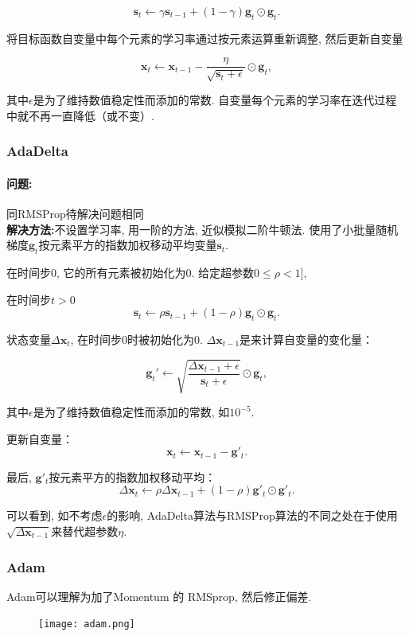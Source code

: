 $$\mathbf{s}_t \leftarrow \gamma \mathbf{s}_{t-1} + (1 - \gamma) \mathbf{g}_t \odot \mathbf{g}_t. $$

将目标函数自变量中每个元素的学习率通过按元素运算重新调整, 然后更新自变量

$$\mathbf{x}_t \leftarrow \mathbf{x}_{t-1} - \frac{\eta}{\sqrt{\mathbf{s}_t + \epsilon}} \odot \mathbf{g}_t,  $$

其中$\epsilon$是为了维持数值稳定性而添加的常数. 自变量每个元素的学习率在迭代过程中就不再一直降低（或不变）. 
\subsubsection{AdaDelta}
\paragraph{问题:}同RMSProp待解决问题相同 \\
\textbf{解决方法:}不设置学习率, 用一阶的方法, 近似模拟二阶牛顿法. 使用了小批量随机梯度$\mathbf{g}_t$按元素平方的指数加权移动平均变量$\mathbf{s}_t$. 

在时间步0, 它的所有元素被初始化为0. 给定超参数$0 \leq \rho < 1$], 

在时间步$t>0$
$$\mathbf{s}_t \leftarrow \rho \mathbf{s}_{t-1} + (1 - \rho) \mathbf{g}_t \odot \mathbf{g}_t. $$

状态变量$\Delta\mathbf{x}_t$, 在时间步0时被初始化为0. $\Delta\mathbf{x}_{t-1}$是来计算自变量的变化量：

$$ \mathbf{g}_t' \leftarrow \sqrt{\frac{\Delta\mathbf{x}_{t-1} + \epsilon}{\mathbf{s}_t + \epsilon}}   \odot \mathbf{g}_t,  $$

其中$\epsilon$是为了维持数值稳定性而添加的常数, 如$10^{-5}$. 

更新自变量：
$$\mathbf{x}_t \leftarrow \mathbf{x}_{t-1} - \mathbf{g}'_t. $$

最后, $\mathbf{g}'_t$按元素平方的指数加权移动平均：
$$\Delta\mathbf{x}_t \leftarrow \rho \Delta\mathbf{x}_{t-1} + (1 - \rho) \mathbf{g}'_t \odot \mathbf{g}'_t. $$

可以看到, 如不考虑$\epsilon$的影响, AdaDelta算法与RMSProp算法的不同之处在于使用$\sqrt{\Delta\mathbf{x}_{t-1}}$来替代超参数$\eta$. 

\subsubsection{Adam} \citep{Kingma2014Adam}
Adam可以理解为加了Momentum 的 RMSprop, 然后修正偏差.
\begin{figure}[htp]
    \centering
     \texttt{[image: adam.png]}
 
    \label{fig:adm}
    \end{figure}

